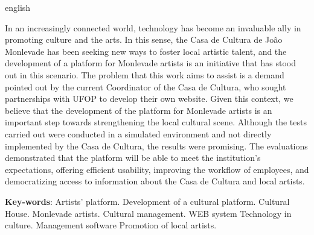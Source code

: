 \begin{resumo}[Abstract]
 \begin{otherlanguage*}{english}

  In an increasingly connected world, technology has become an invaluable ally in promoting culture and the arts. In this sense, the Casa de Cultura de João Monlevade has been seeking new ways to foster local artistic talent, and the development of a platform for Monlevade artists is an initiative that has stood out in this scenario. The problem that this work aims to assist is a demand pointed out by the current Coordinator of the Casa de Cultura, who sought partnerships with UFOP to develop their own website. Given this context, we believe that the development of the platform for Monlevade artists is an important step towards strengthening the local cultural scene. Although the tests carried out were conducted in a simulated environment and not directly implemented by the Casa de Cultura, the results were promising. The evaluations demonstrated that the platform will be able to meet the institution's expectations, offering efficient usability, improving the workflow of employees, and democratizing access to information about the Casa de Cultura and local artists.

   \vspace{\onelineskip}

   \noindent
   \textbf{Key-words}: 
   Artists' platform.
   Development of a cultural platform.
   Cultural House.
   Monlevade artists.
   Cultural management.
   WEB system
   Technology in culture.
   Management software
   Promotion of local artists.
 \end{otherlanguage*}
\end{resumo}